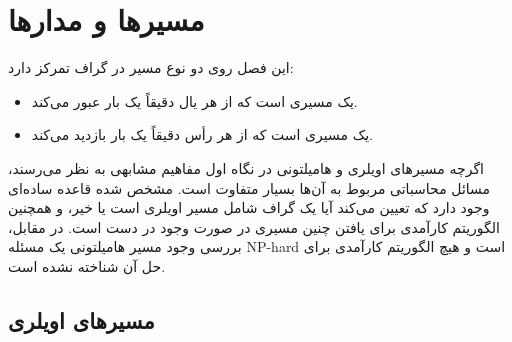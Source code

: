 \chapter{مسیرها و مدارها}

این فصل روی دو نوع مسیر در گراف تمرکز دارد:
\begin{itemize}
\item یک  مسیری است که
از هر یال دقیقاً یک بار عبور می‌کند.
\item یک  مسیری است
که از هر رأس دقیقاً یک بار بازدید می‌کند.
\end{itemize}

اگرچه مسیرهای اویلری و هامیلتونی در نگاه اول مفاهیم مشابهی به نظر می‌رسند،
مسائل محاسباتی مربوط به آن‌ها بسیار متفاوت است.
مشخص شده قاعده ساده‌ای وجود دارد که تعیین می‌کند آیا یک گراف شامل مسیر اویلری است یا خیر،
و همچنین الگوریتم کارآمدی برای یافتن چنین مسیری در صورت وجود در دست است.
در مقابل، بررسی وجود مسیر هامیلتونی یک مسئله NP-hard است
و هیچ الگوریتم کارآمدی برای حل آن شناخته نشده است.

\section{مسیرهای اویلری}


